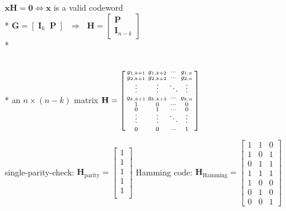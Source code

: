 \documentclass[10pt, landscape]{article}
\begin{document}
\begin{multicols*}{4}
  \begin{tightcenter}
    $\mathbf{xH} = \mathbf{0} \iff \mathbf{x}$ is a valid codeword \\*
    $\mathbf{G} = [\; \mathbf{I}_k \;\; \mathbf{P}\;]$ $\;\Longrightarrow\;$ $\mathbf{H} = \begin{bmatrix}
      \mathbf{P} \\ \mathbf{I}_{n-k}
    \end{bmatrix}$ \\*
  \end{tightcenter}

  \begin{minipage}[c]{0.6\linewidth}
    \begin{tightcenter}\color{black}
       \\*
      an $n \times (n-k)$ matrix
    \( {\displaystyle{ 
        \mathbf{H} = \left[\begin{smallmatrix}
          g_{1,k+1} & g_{1,k+2} & \cdots & g_{1,n} \\
          g_{2,k+1} & g_{2,k+2} & \cdots & g_{2,n} \\
          \vphantom{\int\limits^x}\smash{\vdots} & \smash{\vdots} & \smash{\ddots} & \smash{\vdots} \\
          g_{k,k+1} & g_{k,k+2} & \cdots & g_{k,n} \\
          1 & 0 & \cdots & 0 \\
          0 & 1 & \cdots & 0 \\
          \vphantom{\int\limits^x}\smash{\vdots} & \smash{\vdots} & \smash{\ddots} & \smash{\vdots} \\
          0 & 0 & \cdots & 1
        \end{smallmatrix}\right]
    }} \) 
  \end{tightcenter}
  \end{minipage}
  \begin{minipage}[c]{0.37\linewidth}
    \begin{tightcenter}\color{black}
      single-parity-check:
      $ \mathbf{H}_{\text{parity}} = \left[\begin{smallmatrix}
      1 \\ 1 \\ 1 \\ 1 \\ 1 \\ \end{smallmatrix}\right] $
      Hamming code:
      $ \mathbf{H}_{\text{Hamming}} = \left[\begin{smallmatrix}
          1 & 1 & 0 \\
          1 & 0 & 1 \\
          0 & 1 & 1 \\
          1 & 1 & 1 \\
          1 & 0 & 0 \\
          0 & 1 & 0 \\
          0 & 0 & 1 
      \end{smallmatrix}\right] $
    \end{tightcenter}
  \end{minipage}



\end{multicols*}
\end{document}
